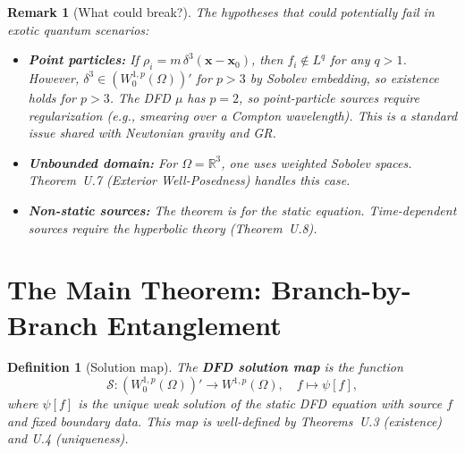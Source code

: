 \documentclass[aps,prd,twocolumn,superscriptaddress,nofootinbib]{revtex4-2}
\newtheorem{definition}[theorem]{Definition}
\newtheorem*{remark}{Remark}
\newcommand{\mufunction}{\mu}
\begin{document}
\begin{remark}[What could break?]
The hypotheses that could potentially fail in exotic quantum scenarios:
\begin{itemize}
\item \textbf{Point particles:} If $\rho_i = m\,\delta^3(\mathbf{x} - \mathbf{x}_0)$,
then $f_i \notin L^q$ for any $q > 1$. However, $\delta^3 \in (W_0^{1,p}(\Omega))'$
for $p > 3$ by Sobolev embedding, so existence holds for $p > 3$. The DFD $\mufunction$
has $p = 2$, so point-particle sources require regularization (e.g., smearing over a
Compton wavelength). This is a standard issue shared with Newtonian gravity and GR.
\item \textbf{Unbounded domain:} For $\Omega = \mathbb{R}^3$, one uses weighted
Sobolev spaces. Theorem~U.7 (Exterior Well-Posedness) handles this case.
\item \textbf{Non-static sources:} The theorem is for the static equation.
Time-dependent sources require the hyperbolic theory (Theorem~U.8).
\end{itemize}
\end{remark}

\section{The Main Theorem: Branch-by-Branch Entanglement}

\begin{definition}[Solution map]
The \textbf{DFD solution map} is the function
\begin{equation}
\mathcal{S}: (W_0^{1,p}(\Omega))' \to W^{1,p}(\Omega), \quad
f \mapsto \psi[f],
\end{equation}
where $\psi[f]$ is the unique weak solution of the static DFD equation
with source $f$ and fixed boundary data. This map is well-defined by
Theorems~U.3 (existence) and U.4 (uniqueness).
\end{definition}
\end{document}
